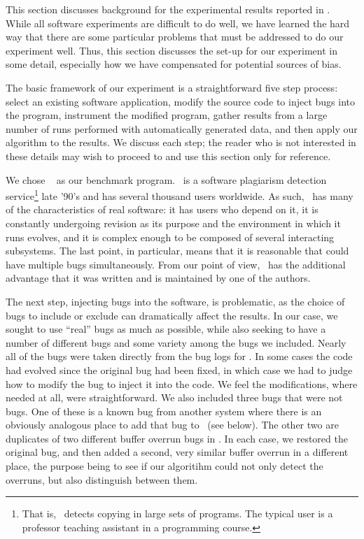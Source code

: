 This section discusses background for the experimental results
reported in .  While all software
experiments are difficult to do well, we have learned the hard way
that there are some particular problems that must be addressed to do
our experiment well.  Thus, this section discusses the set-up for our
experiment in some detail, especially how we have compensated for
potential sources of bias. 

The basic framework of our experiment is a straightforward five step
process: select an existing software application, modify the source
code to inject bugs into the program, instrument the modified program,
gather results from a large number of runs performed with
automatically generated data, and then apply our algorithm to the
results.  We discuss each step; the reader who is not interested in
these details may wish to proceed to  and
use this section only for reference.

We chose \moss\ \cite{Schleimer:2003:WLA} as our benchmark program.  \moss\ is a
software plagiarism detection service\footnote{That is,
\moss\ detects copying in large sets of programs.  The typical \moss
user is a professor teaching assistant in a programming course.}  late
'90's and has several thousand users worldwide.  As such, \moss\ has
many of the characteristics of real software: it has users who depend
on it, it is constantly undergoing revision as its purpose and the
environment in which it runs evolves, and it is complex enough to be
composed of several interacting subsystems.  The last point, in
particular, means that it is reasonable that \moss could have multiple
bugs simultaneously.  From our point of view, \moss\ has the
additional advantage that it was written and is maintained by one of
the authors.

The next step, injecting bugs into the software, is problematic, as
the choice of bugs to include or exclude can dramatically affect the
results.  In our case, we sought to use ``real'' bugs as much as
possible, while also seeking to have a number of different bugs and
some variety among the bugs we included.  Nearly all of the bugs were
taken directly from the bug logs for \moss.  In some cases the code
had evolved since the original bug had been fixed, in which case we
had to judge how to modify the bug to inject it into the code.  We
feel the modifications, where needed at all, were straightforward.  We
also included three bugs that were not \moss bugs.  One of these is a
known bug from another system where there is an obviously analogous
place to add that bug to \moss\ (see below). The other two are
duplicates of two different buffer overrun bugs in \moss.  In each
case, we restored the original bug, and then added a second, very
similar buffer overrun in a different place, the purpose being to see
if our algoritihm could not only detect the overruns, but also
distinguish between them.

